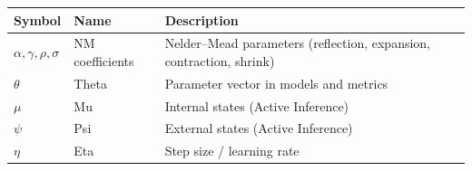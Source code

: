 \documentclass[
  10pt,
]{article}
\begin{document}
\begin{longtable}[]{@{}lll@{}}
\toprule
\begin{minipage}[b]{0.30\columnwidth}\raggedright
Symbol\strut
\end{minipage} & \begin{minipage}[b]{0.30\columnwidth}\raggedright
Name\strut
\end{minipage} & \begin{minipage}[b]{0.30\columnwidth}\raggedright
Description\strut
\end{minipage}\tabularnewline
\midrule
\endhead
\begin{minipage}[t]{0.30\columnwidth}\raggedright
\(\alpha,\gamma,\rho,\sigma\)\strut
\end{minipage} & \begin{minipage}[t]{0.30\columnwidth}\raggedright
NM coefficients\strut
\end{minipage} & \begin{minipage}[t]{0.30\columnwidth}\raggedright
Nelder--Mead parameters (reflection, expansion, contraction,
shrink)\strut
\end{minipage}\tabularnewline
\begin{minipage}[t]{0.30\columnwidth}\raggedright
\(\theta\)\strut
\end{minipage} & \begin{minipage}[t]{0.30\columnwidth}\raggedright
Theta\strut
\end{minipage} & \begin{minipage}[t]{0.30\columnwidth}\raggedright
Parameter vector in models and metrics\strut
\end{minipage}\tabularnewline
\begin{minipage}[t]{0.30\columnwidth}\raggedright
\(\mu\)\strut
\end{minipage} & \begin{minipage}[t]{0.30\columnwidth}\raggedright
Mu\strut
\end{minipage} & \begin{minipage}[t]{0.30\columnwidth}\raggedright
Internal states (Active Inference)\strut
\end{minipage}\tabularnewline
\begin{minipage}[t]{0.30\columnwidth}\raggedright
\(\psi\)\strut
\end{minipage} & \begin{minipage}[t]{0.30\columnwidth}\raggedright
Psi\strut
\end{minipage} & \begin{minipage}[t]{0.30\columnwidth}\raggedright
External states (Active Inference)\strut
\end{minipage}\tabularnewline
\begin{minipage}[t]{0.30\columnwidth}\raggedright
\(\eta\)\strut
\end{minipage} & \begin{minipage}[t]{0.30\columnwidth}\raggedright
Eta\strut
\end{minipage} & \begin{minipage}[t]{0.30\columnwidth}\raggedright
Step size / learning rate\strut
\end{minipage}\tabularnewline
\bottomrule
\end{longtable}
\end{document}
